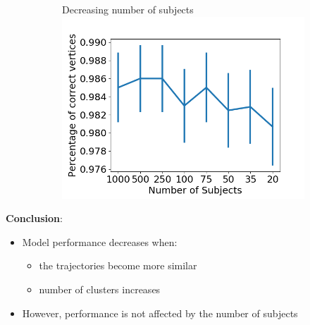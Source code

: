 \documentclass[8pt,xcolor=table]{beamer}
\begin{document}
\begin{frame}
\begin{figure}
\begin{subfigure}{0.3\textwidth}
\caption{}
\end{subfigure}
\begin{subfigure}{0.3\textwidth}
\centering
\small{Decreasing number of subjects}
\includegraphics[scale=0.22]{figures/synth/correctVertices_nrSubj}
\caption{}
\end{subfigure}


\end{figure}

  \textbf{Conclusion}: 
  \begin{itemize}
  \item Model performance decreases when:
    \begin{itemize}
      \item the trajectories become more similar
      \item number of clusters increases
    \end{itemize}
  \item However, performance is not affected by the number of subjects
  \end{itemize}
  
\end{frame}


\end{document}
